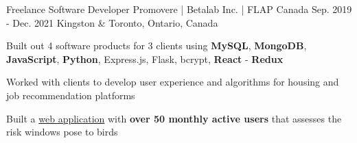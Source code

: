 \begin{cventries}
  \cventry
    {Freelance Software Developer} %
    {Promovere | Betalab Inc. | FLAP Canada} %
    {Sep. 2019 - Dec. 2021} %
    {Kingston \& Toronto, Ontario, Canada} %
    {
      \begin{cvitems} %
        \item{Built out 4 software products for 3 clients using \textbf{MySQL}, \textbf{MongoDB}, \textbf{JavaScript}, \textbf{Python}, Express.js, Flask, bcrypt, \textbf{React} - \textbf{Redux}}
        \item{Worked with clients to develop user experience and algorithms for housing and job recommendation platforms}
        \item {Built a \href{https://www.flapapp.ca/}{web application} with \textbf{over 50 monthly active users} that assesses the risk windows pose to birds}
      \end{cvitems}
    }


\end{cventries}
